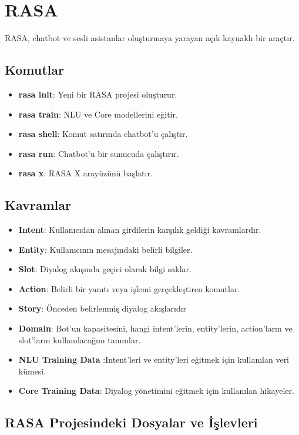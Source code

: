 \section{RASA}

RASA, chatbot ve sesli asistanlar oluşturmaya yarayan açık kaynaklı bir araçtır. 

\subsection{Komutlar}

\begin{itemize}
	\item \textbf{rasa init}: Yeni bir RASA projesi oluşturur.
	\item \textbf{rasa train}: NLU ve Core modellerini eğitir.
	\item \textbf{rasa shell}: Komut satırında chatbot'u çalıştır.
	\item \textbf{rasa run}: Chatbot'u bir sunucuda çalıştırır.
	\item \textbf{rasa x}: RASA X arayüzünü başlatır.
\end{itemize}

\subsection{Kavramlar}

\begin{itemize}
	\item \textbf{Intent}: Kullanıcıdan alınan girdilerin karşılık geldiği kavramlardır.
	\item \textbf{Entity}: Kullanıcının mesajındaki belirli bilgiler.
	\item \textbf{Slot}: Diyalog akışında geçici olarak bilgi saklar.
	\item \textbf{Action}: Belirli bir yanıtı veya işlemi gerçekleştiren komutlar.
	\item \textbf{Story}: Önceden belirlenmiş diyalog akışlarıdır
	\item \textbf{Domain}: Bot'un kapasitesini, hangi intent'lerin, entity'lerin, action'ların ve slot'ların kullanılacağını tanımlar.
	\item \textbf{NLU Training Data} :Intent'leri ve entity'leri eğitmek için kullanılan veri kümesi.
	\item \textbf{Core Training Data}: Diyalog yönetimini eğitmek için kullanılan hikayeler.
\end{itemize}

\subsection{RASA Projesindeki Dosyalar ve İşlevleri}

